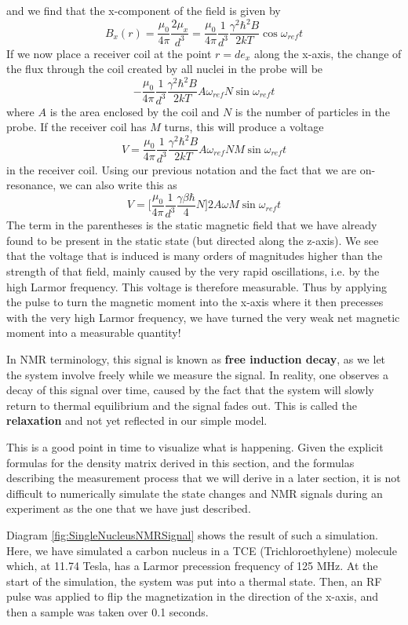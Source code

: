 \documentclass[a4paper, draft]{article}
\theoremstyle{own}
\theoremstyle{remark}
\begin{document}
and we find that the x-component of the field is given by
$$
B_x(r) = \frac{\mu_0}{4\pi} \frac{2 \mu_x}{d^3} 
=
\frac{\mu_0}{4\pi} \frac{1}{d^3} 
\frac{\gamma^2 \hbar^2 B}{2kT}
\cos \omega_{ref} t
$$
If we now place a receiver coil at the point $r = d e_x$ along the x-axis, the change of the flux through the coil created by all nuclei in the probe will be
$$
- \frac{\mu_0}{4\pi} \frac{1}{d^3} 
\frac{\gamma^2 \hbar^2 B}{2kT}
A \omega_{ref} N \sin \omega_{ref} t
$$
where $A$ is the area enclosed by the coil and $N$ is the number of particles in the probe. If the receiver coil has $M$ turns, this will produce a voltage
$$
V = \frac{\mu_0}{4\pi} \frac{1}{d^3} 
\frac{\gamma^2 \hbar^2 B}{2kT}
A \omega_{ref} N M \sin \omega_{ref} t
$$
in the receiver coil. Using our previous notation and the fact that we are on-resonance, we can also write this as
$$
V = \big[ \frac{\mu_0}{4\pi} \frac{1}{d^3}  \frac{\gamma \beta \hbar}{4} N \big]  2 A \omega  M \sin \omega_{ref} t
$$
The term in the parentheses is the static magnetic field that we have already found to be present in the static state (but directed along the z-axis). We see that the voltage that is induced is many orders of magnitudes higher than the strength of that field, mainly caused by the very rapid oscillations, i.e. by the high Larmor frequency. This voltage is therefore measurable. Thus by applying the pulse to turn the magnetic moment into the x-axis where it then precesses with the very high Larmor frequency, we have turned the very weak net magnetic moment into a measurable quantity! 

In NMR terminology, this signal is known as {\bf free induction decay}, as we let the system involve freely while we measure the signal. In reality, one observes a decay of this signal over time, caused by the fact that the system will slowly return to thermal equilibrium and the signal fades out. This is called the {\bf relaxation} and not yet reflected in our simple model.

This is a good point in time to visualize what is happening. Given the explicit formulas for the density matrix derived in this section, and the formulas describing the measurement process that we will derive in a later section, it is not difficult to numerically simulate the state changes and NMR signals during an experiment as the one that we have just described. 

Diagram \ref{fig:SingleNucleusNMRSignal} shows the result of such a simulation. Here, we have simulated a carbon nucleus in a TCE (Trichloroethylene) molecule which, at 11.74 Tesla, has a Larmor precession frequency of 125 MHz. At the start of the simulation, the system was put into a thermal state. Then, an RF pulse was applied to flip the magnetization in the direction of the x-axis, and then a sample was taken over 0.1 seconds.
\end{document}
